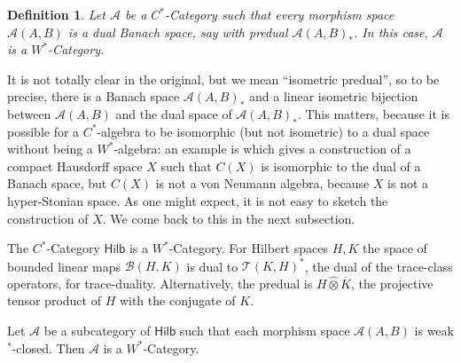 \documentclass[a4paper,11pt]{article}
\theoremstyle{plain}
\newtheorem{definition}[proposition]{Definition}
\theoremstyle{remark}
\newenvironment{example}
  {\pushQED{\qed}\renewcommand{\qedsymbol}{$\triangle$}\examplex}
  {\popQED\endexamplex}
\newcommand{\mc}[1]{\mathcal{#1}}
\newcommand{\proten}{\widehat\otimes}
\newcommand{\catHilb}{\textsf{Hilb}}
\begin{document}
\begin{definition}
Let $\mc A$ be a $C^*$-Category such that every morphism space $\mc A(A,B)$ is a dual Banach space, say with predual $\mc A(A,B)_*$.  In this case, $\mc A$ is a \emph{$W^*$-Category}.
\end{definition}

It is not totally clear in the original, but we mean ``isometric predual'', so to be precise, there is a Banach space $\mc A(A,B)_*$ and a linear isometric bijection between $\mc A(A,B)$ and the dual space of $\mc A(A,B)_*$.  This matters, because it is possible for a $C^*$-algebra to be isomorphic (but not isometric) to a dual space without being a $W^*$-algebra: an example is \cite[Example~6.9.10]{DDLS_CX_spaces_Book} which gives a construction of a compact Hausdorff space $X$ such that $C(X)$ is isomorphic to the dual of a Banach space, but $C(X)$ is not a von Neumann algebra, because $X$ is not a hyper-Stonian space.  As one might expect, it is not easy to sketch the construction of $X$.  We come back to this in the next subsection.

\begin{example}
The $C^*$-Category $\catHilb$ is a $W^*$-Category.  For Hilbert spaces $H,K$ the space of bounded linear maps $\mc B(H,K)$ is dual to $\mc T(K,H)^*$, the dual of the trace-class operators, for trace-duality.  Alternatively, the predual is $H \proten \overline K$, the projective tensor product of $H$ with the conjugate of $K$.
\end{example}

\begin{example}\label{eg:subcat_Hilb_WStar}
Let $\mc A$ be a subcategory of $\catHilb$ such that each morphism space $\mc A(A,B)$ is weak$^*$-closed.  Then $\mc A$ is a $W^*$-Category.
\end{example}
\end{document}

